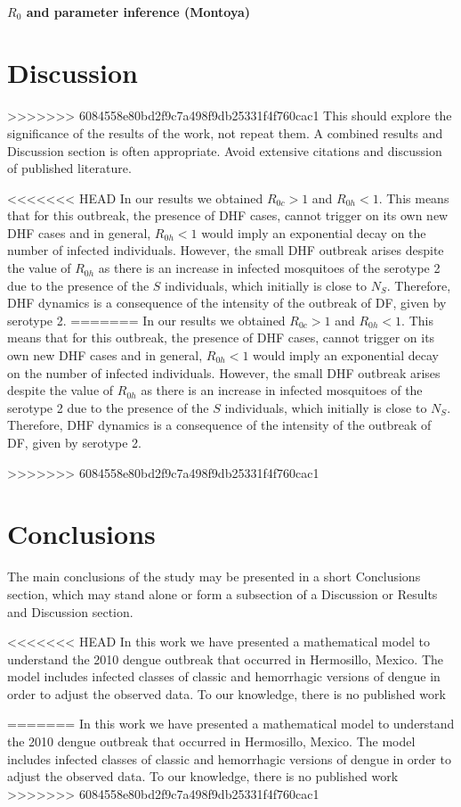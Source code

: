 \documentclass[draft, openbib]{imammb}
\numberwithin{equation}{section}
\begin{document}
        \paragraph{$R_0$ and parameter inference (Montoya)}

\section{Discussion}
>>>>>>> 6084558e80bd2f9c7a498f9db25331f4f760cac1
        This should explore the significance of the results of 
    the work, not repeat them. A combined results and 
    Discussion section is often appropriate. Avoid extensive 
    citations and discussion of published literature.

<<<<<<< HEAD
        In our results we obtained $R_{0c}>1$ and  $R_{0h}<1$. This means that 
    for this outbreak, the presence of DHF cases, cannot trigger on its own new 
    DHF cases and in general, $R_{0h}<1$ would imply an exponential decay on 
    the number of infected individuals. However, the small DHF outbreak arises 
    despite the value of $R_{0h}$ as there is an increase in infected 
    mosquitoes of the serotype 2 due to the presence of the $S$ individuals, 
    which initially is close to $N_S$. Therefore, DHF dynamics is a consequence 
    of the intensity of the outbreak of DF, given by serotype 2. 
%
=======
        In our results we obtained $R_{0c}>1$ and  $R_{0h}<1$. This means
    that for this outbreak, the presence of DHF cases, cannot trigger
    on its own new DHF cases and in general, $R_{0h}<1$ would imply an
    exponential decay on the number of infected individuals. However,
    the small DHF outbreak arises despite the value of $R_{0h}$ as
    there is an increase in infected mosquitoes of the serotype 2 due
    to the presence of the $S$ individuals, which initially is close
    to $N_S$. Therefore, DHF dynamics is a consequence of the
    intensity of the outbreak of DF, given by serotype 2. 
    
    
    
>>>>>>> 6084558e80bd2f9c7a498f9db25331f4f760cac1
    \section{Conclusions}
        The main conclusions of the study may be presented in a 
    short Conclusions section, which may stand alone or form 
    a subsection of a Discussion or Results and Discussion 
    section.
    
<<<<<<< HEAD
    In this work we have presented a mathematical model to understand the 2010 
    dengue outbreak that occurred in Hermosillo, Mexico. The model includes 
    infected classes of classic and hemorrhagic versions of dengue in order to 
    adjust the observed data. To our knowledge, there is no published work
    
=======
        In this work we have presented a mathematical model to understand
    the 2010 dengue outbreak that occurred in Hermosillo, Mexico. The
    model includes infected classes of classic and hemorrhagic
    versions of dengue in order to adjust the observed data. To our
    knowledge, there is no published work
>>>>>>> 6084558e80bd2f9c7a498f9db25331f4f760cac1
    
\end{document}
